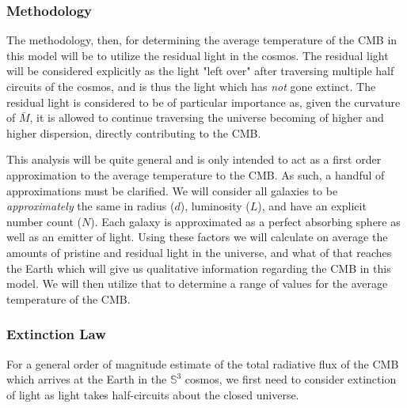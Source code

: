 \documentclass[a4paper]{article}
\begin{document}
    \subsubsection{Methodology}
    
    The  methodology, then, for determining the average temperature of the CMB
    in this model will be to utilize the residual light in the cosmos. The
    residual light will be considered explicitly as the light "left over" after
    traversing multiple half circuits of the cosmos, and is thus the
    light which has \textit{not} gone extinct. The residual light is considered
    to be of particular importance as, given the curvature of $\bar{M}$, it is
    allowed to continue traversing the universe becoming of higher and higher
    dispersion, directly contributing to the CMB.

    This analysis will be quite general and is only intended to act as a first
    order approximation to the average temperature to the CMB. As such, a
    handful of approximations must be clarified. We will consider
    all galaxies to be \textit{approximately} the same in radius ($d$),
    luminosity ($L$), and have an explicit number count ($N$). Each galaxy is
    approximated as a perfect absorbing sphere as well as an emitter of light.
    Using these factors we will calculate on average the amounts of pristine
    and residual light in the universe, and what of that reaches the Earth
    which will give us qualitative information regarding the CMB in this model.
    We will then utilize that to determine a range of values for the average
    temperature of the CMB.

    \subsubsection{Extinction Law}
    For a general order of magnitude estimate of the total radiative flux of
    the CMB which arrives at the Earth in the $\mathbb{S}^3$ cosmos, we first
    need to consider extinction of light as light takes half-circuits about
    the closed universe. 
\end{document}
